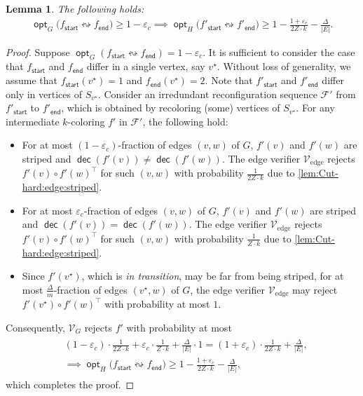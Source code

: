 \documentclass[11pt,fleqn]{article}
\renewcommand{\geq}{\geqslant}
\renewcommand{\epsilon}{\varepsilon}
\renewcommand{\top}{\intercal}
\newcommand{\reco}{\leftrightsquigarrow}
\DeclareMathOperator{\opt}{\mathsf{opt}}
\DeclareMathOperator{\dec}{\mathsf{dec}}
\newcommand{\sss}{\mathsf{start}}
\newcommand{\ttt}{\mathsf{end}}
\newcommand{\V}{\calV}
\newcommand{\f}{f}
\newcommand{\sqcol}{\scrF}
\newcommand{\Vedge}{\V_\mathrm{edge}}
\newcommand{\calV}{\mathcal{V}}
\newcommand{\scrF}{\mathscr{F}}
\newtheorem{lemma}[theorem]{Lemma}
\theoremstyle{definition}
\numberwithin{equation}{section}
\begin{document}
\begin{lemma}
\label{lem:Cut-hard:complete}
    The following holds\textup{:}
    \begin{align}
        \opt_G\bigl(\f_\sss \reco \f_\ttt\bigr) \geq 1-\epsilon_c
        \implies \opt_H\bigl(\f'_\sss \reco \f'_\ttt\bigr) \geq 1-\frac{1+\epsilon_c}{2Z \cdot k} - \frac{\Delta}{|E|}.
    \end{align}
\end{lemma}
\begin{proof} Suppose $\opt_G(\f_\sss \reco \f_\ttt) = 1-\epsilon_c$.
It is sufficient to consider the case that
    $\f_\sss$ and $\f_\ttt$ differ in a single vertex, say $v^\star$.
Without loss of generality, we assume that
    $\f_\sss(v^\star) = 1$ and $\f_\ttt(v^\star) = 2$.
Note that $\f'_\sss$ and $\f'_\ttt$ differ only in vertices of $S_{v^\star}$.
Consider an irredundant reconfiguration sequence $\sqcol'$
from $\f'_\sss$ to $\f'_\ttt$,
which is obtained
by recoloring (some) vertices of $S_{v^\star}$.
For any intermediate $k$-coloring $\f'$ in $\sqcol'$, the following hold:
\begin{itemize}
    \item For at most $(1-\epsilon_c)$-fraction of edges $(v,w)$ of $G$,
        $\f'(v)$ and $\f'(w)$ are striped and
        $\dec(\f'(v)) \neq \dec(\f'(w))$.
        The edge verifier $\Vedge$ rejects $\f'(v) \circ \f'(w)^\top$ for such $(v,w)$ with probability $\frac{1}{2Z\cdot k}$
        due to \cref{lem:Cut-hard:edge:striped}.
    \item For at most $\epsilon_c$-fraction of edges $(v,w)$ of $G$,
        $\f'(v)$ and $\f'(w)$ are striped and
        $\dec(\f'(v)) = \dec(\f'(w))$.
        The edge verifier $\Vedge$ rejects $\f'(v) \circ \f'(w)^\top$ for such $(v,w)$
        with probability $\frac{1}{Z \cdot k}$
        due to \cref{lem:Cut-hard:edge:striped}.
    \item Since $\f'(v^\star)$, which is \emph{in transition}, may be far from being striped,
        for at most $\frac{\Delta}{m}$-fraction of edges $(v^\star,w)$ of $G$,
        the edge verifier $\Vedge$ may reject $\f'(v^\star) \circ \f'(w)^\top$ with probability at most $1$.
\end{itemize}
Consequently, $\V_G$ rejects $\f'$ with probability at most
\begin{align}
\begin{aligned}
    & (1-\epsilon_c) \cdot \frac{1}{2Z \cdot k}
    + \epsilon_c \cdot \frac{1}{Z \cdot k}
    + \frac{\Delta}{|E|} \cdot 1
    = (1+\epsilon_c)\cdot \frac{1}{2Z \cdot k} + \frac{\Delta}{|E|}, \\
    & \implies 
    \opt_H\bigl(\f_\sss \reco \f_\ttt\bigr) \geq 1-\frac{1+\epsilon_c}{2Z \cdot k} - \frac{\Delta}{|E|},
\end{aligned}
\end{align}
which completes the proof.
\end{proof}
\end{document}
